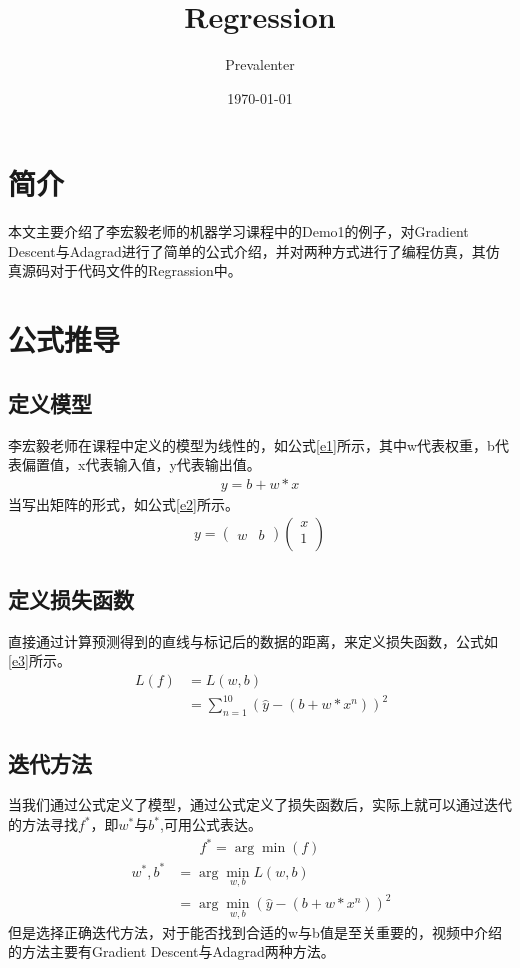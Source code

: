 \documentclass[10]{article}
\title{Regression}
\author{Prevalenter}
\date{\today}
\begin{document}
	\maketitle
	\section{简介}
	本文主要介绍了李宏毅老师的机器学习课程中的Demo1的例子，对Gradient Descent与Adagrad进行了简单的公式介绍，并对两种方式进行了编程仿真，其仿真源码对于代码文件的Regrassion中。
	\section{公式推导}
		\subsection{定义模型}
			李宏毅老师在课程中定义的模型为线性的，如公式\ref{e1}所示，其中w代表权重，b代表偏置值，x代表输入值，y代表输出值。
			\begin{gather}
				y=b+w*x\label{e1}
			\end{gather}
			当写出矩阵的形式，如公式\ref{e2}所示。
			\begin{gather}
				y=\begin{pmatrix}
				w & b
				\end{pmatrix}
				\begin{pmatrix}
				x\\
				1\\
				\end{pmatrix}\label{e2}
			\end{gather}

		\subsection{定义损失函数}
		直接通过计算预测得到的直线与标记后的数据的距离，来定义损失函数，公式如\ref{e3}所示。
			\begin{equation}
				\begin{split}
				\ L(f)&=L(w,b) \\
				&=\sum_{n=1}^{10}(\hat{y}-(b+w*x^{n}))^{2}\label{e3}
				\end{split}
			\end{equation}
		\subsection{迭代方法}
			当我们通过公式定义了模型，通过公式定义了损失函数后，实际上就可以通过迭代的方法寻找$ f^{*} $，即$ w^{*} $与$ b^{*} $,可用公式表达。
			\begin{gather}
				f^{*}=\arg \min(f)	\label{e4}
			\end{gather}		
			\begin{equation}
				\begin{split}
				\ w^{*},b^{*}&=\arg \min_{w,b}L(w,b) \\
				&=\arg \min_{w,b}(\hat{y}-(b+w*x^{n}))^{2}\label{e5}
				\end{split}
			\end{equation}
			但是选择正确迭代方法，对于能否找到合适的w与b值是至关重要的，视频中介绍的方法主要有Gradient Descent与Adagrad两种方法。
\end{document}
